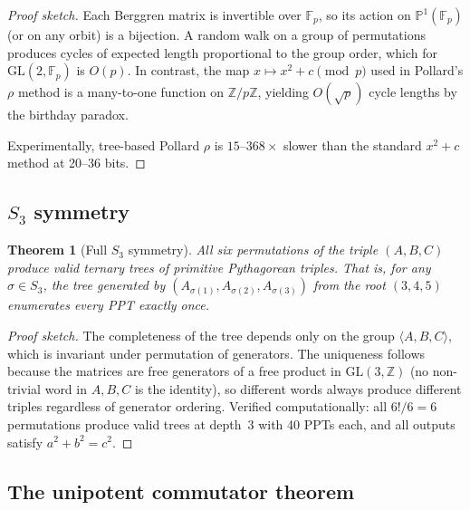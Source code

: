 \documentclass[12pt]{amsart}
\newtheorem{theorem}{Theorem}[section]
\theoremstyle{definition}
\theoremstyle{remark}
\begin{document}
\begin{proof}[Proof sketch]
Each Berggren matrix is invertible over $\mathbb{F}_{p}$, so its action on
$\mathbb{P}^{1}(\mathbb{F}_{p})$ (or on any orbit) is a bijection.  A random
walk on a group of permutations produces cycles of expected length proportional
to the group order, which for $\mathrm{GL}(2,\mathbb{F}_{p})$ is $O(p)$.  In
contrast, the map $x\mapsto x^{2}+c\pmod{p}$ used in Pollard's $\rho$ method
is a many-to-one function on $\mathbb{Z}/p\mathbb{Z}$, yielding $O(\sqrt{p})$
cycle lengths by the birthday paradox.

Experimentally, tree-based Pollard $\rho$ is $15$--$368\times$ slower than the
standard $x^{2}+c$ method at 20--36 bits.
\end{proof}

\subsection{\texorpdfstring{$S_{3}$}{S3} symmetry}

\begin{theorem}[Full $S_{3}$ symmetry]\label{thm:S3}
All six permutations of the triple $(A,B,C)$ produce valid ternary trees of
primitive Pythagorean triples.  That is, for any $\sigma\in S_{3}$, the tree
generated by $(A_{\sigma(1)},A_{\sigma(2)},A_{\sigma(3)})$ from the root
$(3,4,5)$ enumerates every PPT exactly once.
\end{theorem}

\begin{proof}[Proof sketch]
The completeness of the tree depends only on the group $\langle A,B,C\rangle$,
which is invariant under permutation of generators.  The uniqueness follows
because the matrices are free generators of a free product in
$\mathrm{GL}(3,\mathbb{Z})$ (no non-trivial word in $A,B,C$ is the identity),
so different words always produce different triples regardless of generator
ordering.  Verified computationally: all $6!/6=6$ permutations produce valid
trees at depth~3 with 40 PPTs each, and all outputs satisfy $a^{2}+b^{2}=c^{2}$.
\end{proof}

\subsection{The unipotent commutator theorem}
\end{document}

